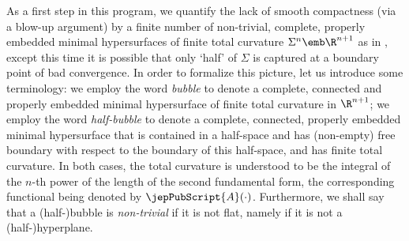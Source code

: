      			
     			
     		As a first step in this program, we quantify the lack of smooth compactness (via a blow-up argument) by a finite number of non-trivial, complete, properly embedded minimal hypersurfaces of finite total curvature $\Sigma^n\emb \R^{n+1}$ as in \cite{BS17}, except this time it is possible that only `half' of $\Sigma$ is captured at a boundary point of bad convergence. In order to formalize this picture, let us introduce some terminology:
     		we employ the word \textsl{bubble} to denote a complete, connected and properly embedded minimal hypersurface of finite total curvature in $\R^{n+1}$; we employ the word \textsl{half-bubble} to denote a complete, connected, properly embedded minimal hypersurface that is contained in a half-space and has (non-empty) free boundary with respect to the boundary of this half-space,  and has finite total curvature. In both cases, the total curvature is understood to be the integral of the $n$-th power of the length of the second fundamental form, the corresponding functional being denoted by ${\jepPubScript{A}}(\cdot)$. Furthermore, we shall say that a (half-)bubble is \textsl{non-trivial} if it is not flat, namely if it is not a (half-)hyperplane.
     		
     		
\setcounter{section}{1}\setcounter{thm}{10}
